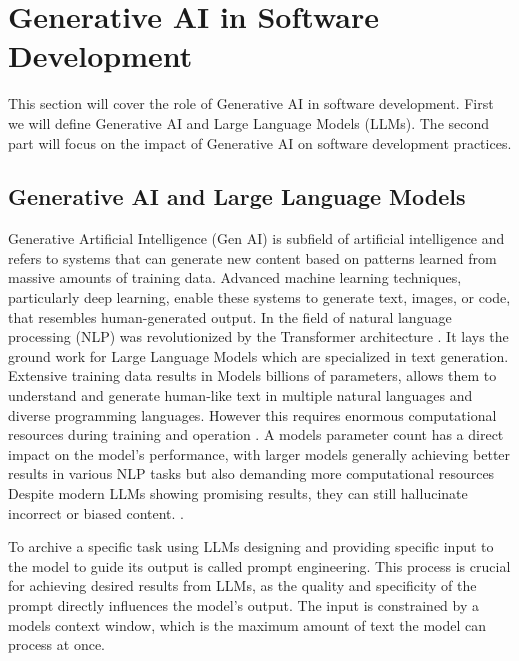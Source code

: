 \section{Generative AI in Software Development}

This section will cover the role of Generative AI in software development. First we will define Generative AI and Large Language Models (LLMs). The second part will focus on the impact of Generative AI on software development practices.
\subsection{Generative AI and Large Language Models}

Generative Artificial Intelligence (Gen AI) is subfield of artificial intelligence and refers to systems that can generate new content based on patterns learned from massive amounts of training data. Advanced machine learning techniques, particularly deep learning, enable these systems to generate text, images, or code, that resembles human-generated output.
In the field of natural language processing (NLP) was revolutionized by the Transformer architecture \cite{changSurveyEvaluationLarge2024}. It lays the ground work for Large Language Models which are specialized in text generation. Extensive training data results in Models billions of parameters, allows them to understand and generate human-like text in multiple natural languages and diverse programming languages. However this requires enormous computational resources during training and operation \cite{LLMsWhatsLarge}. A models parameter count has a direct impact on the model's performance, with larger models generally achieving better results in various NLP tasks but also demanding more computational resources %
Despite modern LLMs showing promising results, they can still hallucinate incorrect or biased content. \cite{LLMsWhatsLarge}.

To archive a specific task using LLMs designing and providing specific input to the model to guide its output is called prompt engineering. This process is crucial for achieving desired results from LLMs, as the quality and specificity of the prompt directly influences the model's output. The input is constrained by a models context window, which is the maximum amount of text the model can process at once.

